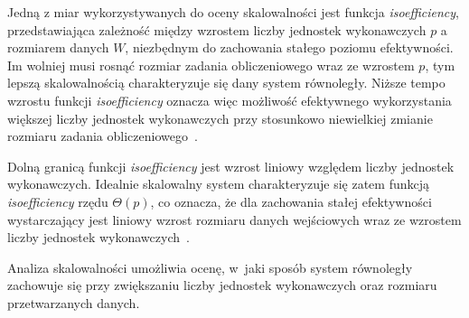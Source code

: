 Jedną z miar wykorzystywanych do oceny skalowalności jest funkcja \textit{isoefficiency}, 
przedstawiająca zależność między wzrostem liczby jednostek wykonawczych $p$ a rozmiarem danych $W$, 
niezbędnym do zachowania stałego poziomu efektywności.
Im wolniej musi rosnąć rozmiar zadania obliczeniowego wraz ze wzrostem $p$, tym lepszą skalowalnością charakteryzuje się dany system równoległy. 
Niższe tempo wzrostu funkcji \textit{isoefficiency} oznacza więc możliwość efektywnego wykorzystania 
większej liczby jednostek wykonawczych przy stosunkowo niewielkiej zmianie rozmiaru zadania obliczeniowego~\cite{bib:Grama}.

Dolną granicą funkcji \textit{isoefficiency} jest wzrost liniowy względem liczby jednostek wykonawczych. 
Idealnie skalowalny system charakteryzuje się zatem funkcją \textit{isoefficiency} rzędu $\Theta(p)$, co oznacza, 
że dla zachowania stałej efektywności wystarczający jest liniowy wzrost rozmiaru danych wejściowych 
wraz ze wzrostem liczby jednostek wykonawczych~\cite{bib:Grama}.

Analiza skalowalności umożliwia ocenę, w~jaki sposób system równoległy zachowuje się przy 
zwiększaniu liczby jednostek wykonawczych oraz rozmiaru przetwarzanych danych.
